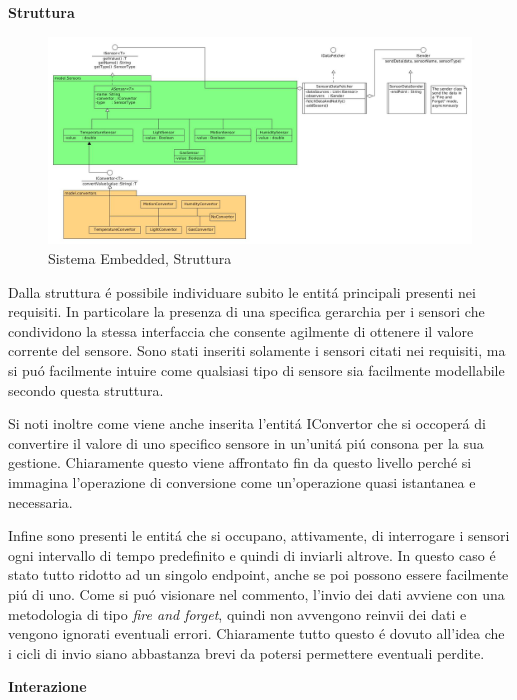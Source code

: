 \begin{center}
 \textbf{Struttura}
\end{center}

\begin{figure}[h]
\centering
\includegraphics[width=\textwidth]{Figures/DomainModel/EmbeddedSystem/Structure}
\caption{Sistema Embedded, Struttura}
\end{figure}

Dalla struttura \'e possibile individuare subito le entit\'a principali presenti nei requisiti. In particolare la presenza di una specifica gerarchia per i sensori che condividono la stessa interfaccia che consente agilmente di ottenere il valore corrente del sensore. Sono stati inseriti solamente i sensori citati nei requisiti, ma si pu\'o facilmente intuire come qualsiasi tipo di sensore sia facilmente modellabile secondo questa struttura.

Si noti inoltre come viene anche inserita l'entit\'a IConvertor che si occoper\'a di convertire il valore di uno specifico sensore in un'unit\'a pi\'u consona per la sua gestione. Chiaramente questo viene affrontato fin da questo livello perch\'e si immagina l'operazione di conversione come un'operazione quasi istantanea e necessaria.

Infine sono presenti le entit\'a che si occupano, attivamente, di interrogare i sensori ogni intervallo di tempo predefinito e quindi di inviarli altrove. In questo caso \'e stato tutto ridotto ad un singolo endpoint, anche se poi possono essere facilmente pi\'u di uno. Come si pu\'o visionare nel commento, l'invio dei dati avviene con una metodologia di tipo \textit{fire and forget}, quindi non avvengono reinvii dei dati e vengono ignorati eventuali errori. Chiaramente tutto questo \'e dovuto all'idea che i cicli di invio siano abbastanza brevi da potersi permettere eventuali perdite.

\begin{center}
\textbf{Interazione}
\end{center}

